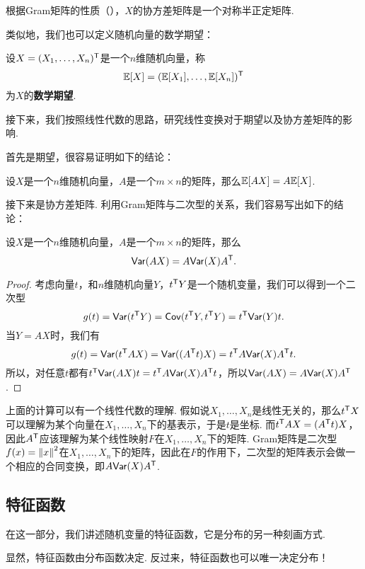 根据Gram矩阵的性质（），$X$的协方差矩阵是一个对称半正定矩阵. 

类似地，我们也可以定义随机向量的数学期望：

\begin{definition}[随机向量的数学期望]
设$X=(X_1,\dots,X_n)^{\mathsf{T}}$是一个$n$维随机向量，称
\[\mathbb{E}[X]=(\mathbb{E}[X_1],\dots,\mathbb{E}[X_n])^{\mathsf{T}}\]
为$X$的\textbf{数学期望}. 
\end{definition}

接下来，我们按照线性代数的思路，研究线性变换对于期望以及协方差矩阵的影响. 

首先是期望，很容易证明如下的结论：

\begin{proposition}\label{prop:expectation-linear}
设$X$是一个$n$维随机向量，$A$是一个$m\times n$的矩阵，那么$\mathbb{E}[AX]=A\mathbb{E}[X]$.
\end{proposition}

接下来是协方差矩阵. 利用Gram矩阵与二次型的关系，我们容易写出如下的结论：

\begin{proposition}\label{prop:covariance-linear}
设$X$是一个$n$维随机向量，$A$是一个$m\times n$的矩阵，那么
\[\mathsf{Var}(AX)=A\mathsf{Var}(X)A^{\mathsf{T}}.\]
\end{proposition}
\begin{proof}
考虑向量$t$，和$n$维随机向量$Y$，$t^{\mathsf{T}} Y$是一个随机变量，我们可以得到一个二次型
\[g(t)=\mathsf{Var}(t^{\mathsf{T}} Y)=\mathsf{Cov}(t^{\mathsf{T}} Y,t^{\mathsf{T}} Y)=t^{\mathsf{T}}\mathsf{Var}(Y)t.\]
当$Y=AX$时，我们有
\[g(t)=\mathsf{Var}(t^{\mathsf{T}} AX)=\mathsf{Var}((A^{\mathsf{T}} t)X)=t^{\mathsf{T}} A\mathsf{Var}(X)A^{\mathsf{T}} t.\]
所以，对任意$t$都有$t^{\mathsf{T}}\mathsf{Var}(AX)t=t^{\mathsf{T}} A\mathsf{Var}(X)A^{\mathsf{T}} t$，所以$\mathsf{Var}(AX)=A\mathsf{Var}(X)A^{\mathsf{T}}$.
\end{proof}

上面的计算可以有一个线性代数的理解. 假如说$X_1,\dots,X_n$是线性无关的，那么$t^{\mathsf{T}} X$可以理解为某个向量在$X_1,\dots,X_n$下的基表示，于是$t$是坐标. 而$t^{\mathsf{T}} AX=(A^{\mathsf{T}} t)X$，因此$A^{\mathsf{T}}$应该理解为某个线性映射$F$在$X_1,\dots,X_n$下的矩阵. Gram矩阵是二次型$f(x)=\left\|x\right\|^2$在$X_1,\dots,X_n$下的矩阵，因此在$F$的作用下，二次型的矩阵表示会做一个相应的合同变换，即$A\mathsf{Var}(X)A^{\mathsf{T}}$.

\subsection{特征函数} \label{subsec:characteristic-function}

在这一部分，我们讲述随机变量的特征函数，它是分布的另一种刻画方式. 

显然，特征函数由分布函数决定. 反过来，特征函数也可以唯一决定分布！

